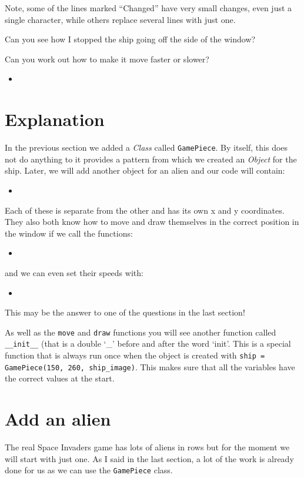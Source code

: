\documentclass[12pt]{article}
\newcommand{\pythonscript}[2]{
\begin{itemize}
\item[]
\end{itemize}
}
\newenvironment{hint}{
  \begin{tcolorbox}[colback=green!5,colframe=green!40!black,title=Note]}
{\end{tcolorbox}}
\begin{document}
\begin{hint}
Note, some of the lines marked ``Changed'' have very small changes, even just a
single character, while others replace several lines with just one.

Can you see how I stopped the ship going off the side of the window?

Can you work out how to make it move faster or slower?
\end{hint}

\pythonscript{classes}{Adding classes}

\section{Explanation}

In the previous section we added a \emph{Class} called \texttt{GamePiece}.
By itself, this does not do anything to it provides a pattern from which
we created an \emph{Object} for the ship. Later, we will add another object
for an alien and our code will contain:

\pythonscript{explanation1}{Object creation example}

Each of these is separate from the other and has its own x and y coordinates.
They also both know how to move and draw themselves in the correct position
in the window if we call the functions:

\pythonscript{explanation2}{Function call example}

and we can even set their speeds with:

\pythonscript{explanation3}{Setting object variables}

\begin{hint}
This may be the answer to one of the questions in the last section!
\end{hint}

As well as the \texttt{move} and \texttt{draw} functions you will see another
function called \texttt{\_\_init\_\_} (that is a double `\_' before and after
the word `init'. This is a special function that is always run once when the
object is created with \texttt{ship = GamePiece(150, 260, ship\_image)}.
This makes sure that all the variables have the correct values at the start.

\section{Add an alien}

The real Space Invaders game has lots of aliens in rows but for the moment we
will start with just one. As I said in the last section, a lot of the work is
already done for us as we can use the \texttt{GamePiece} class.
\end{document}
